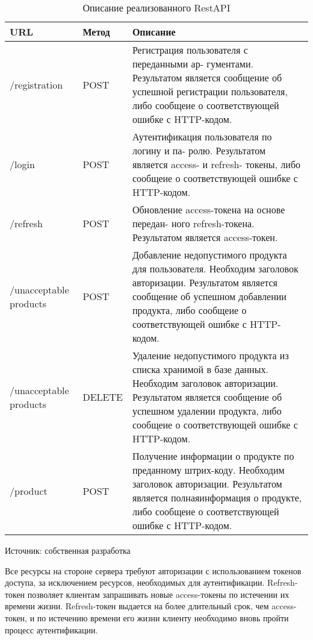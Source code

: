\begin{singlespacing}
	\begin{table}[H]
		\caption{Описание реализованного RestAPI}\label{APIdescription}
		\begin{tabular}{|  p{80pt} |  p{80pt} |  p{290pt} |}
			\hline 
			URL & Метод & Описание \\
			\hline
			/registration & POST & Регистрация пользователя с переданными ар-
			гументами. Результатом является сообщение об успешной регистрации пользователя, либо сообщеие о соответствующей ошибке с HTTP-кодом. \\
			\hline
			/login & POST & Аутентификация пользователя по логину и па-
			ролю. Результатом является access- и refresh- токены, либо сообщеие о соответствующей ошибке с HTTP-кодом. \\
			\hline
			/refresh & POST & Обновление access-токена на основе передан-
			ного refresh-токена. Результатом является access-токен. \\
			\hline
			/unacceptable products & POST & Добавление недопустимого продукта для пользователя. Необходим заголовок авторизации. Результатом является сообщение об успешном добавлении продукта, либо сообщеие о соответствующей ошибке с HTTP-кодом. \\
			\hline
			/unacceptable products & DELETE & Удаление недопустимого продукта из списка хранимой в базе данных. Необходим заголовок авторизации. Результатом является сообщение об успешном удалении продукта, либо сообщеие о соответствующей ошибке с HTTP-кодом. \\
			\hline
			/product & POST & Получение информации о продукте по преданному штрих-коду. Необходим заголовок авторизации. Результатом является полнаяинформация о продукте, либо сообщеие о соответствующей ошибке с HTTP-кодом. \\
			\hline
		\end{tabular}
		Источник: собственная разработка
	\end{table}
\end{singlespacing}
Все ресурсы на стороне сервера требуют авторизации с использованием токенов доступа, за исключением ресурсов, необходимых для аутентификации. Refresh-токен позволяет клиентам запрашивать новые access-токены по истечении их времени жизни. Refresh-токен выдается на более длительный срок, чем access-токен, и по истечению времени его жизни клиенту необходимо вновь пройти процесс аутентификации. 



\clearpage